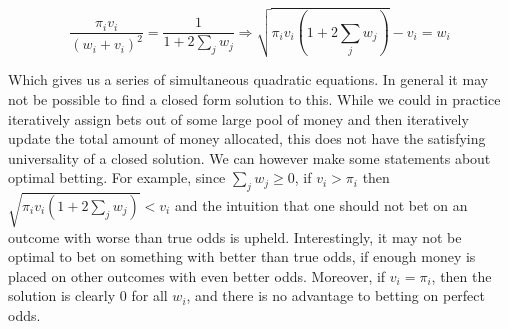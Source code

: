 \documentclass[11pt]{article}
\begin{document}
\begin{equation}
\frac{\pi_i v_i}{(w_i + v_i)^2} = \frac{1}{1+2\sum_j w_j} \Rightarrow \sqrt{\pi_i v_i (1+ 2\sum_j w_j)} -v_i = w_i
\label{eq:optimum}
\end{equation}

Which gives us a series of simultaneous quadratic equations.  In general it may not be possible to find a closed form solution to this.  While we could in practice iteratively assign bets out of some large pool of money and then iteratively update the total amount of money allocated, this does not have the satisfying universality of a closed solution.  We can however make some statements about optimal betting.  For example, since $\sum_j w_j \ge 0$, if $v_i > \pi_i$ then $\sqrt{\pi_i v_i (1 + 2\sum_j w_j)} < v_i$ and the intuition that one should not bet on an outcome with worse than true odds is upheld.  Interestingly, it may not be optimal to bet on something with better than true odds, if enough money is placed on other outcomes with even better odds.  Moreover, if $v_i = \pi_i$, then the solution is clearly 0 for all $w_i$, and there is no advantage to betting on perfect odds.
\end{document}
